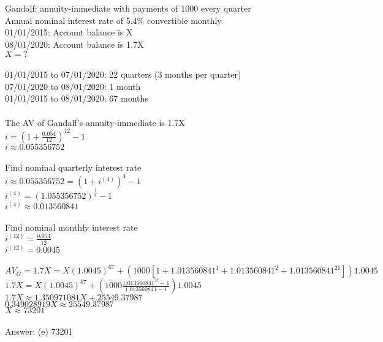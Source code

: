 \documentclass[12pt]{article}
\begin{document}
\section{}
Gandalf: annuity-immediate with payments of 1000 every quarter\\
Annual nominal interest rate of 5.4\% convertible monthly\\
01/01/2015: Account balance is X\\
08/01/2020: Account balance is 1.7X\\
$X=?$\\
\\
01/01/2015 to 07/01/2020: 22 quarters (3 months per quarter)\\
07/01/2020 to 08/01/2020: 1 month\\
01/01/2015 to 08/01/2020: 67 months\\
\\
The AV of Gandalf's annuity-immediate is 1.7X\\
$i=(1+\frac{0.054}{12})^{12}-1$\\
$i\approx0.055356752$\\
\\
Find nominal quarterly interest rate\\
$i\approx0.055356752=(1+i^{(4)})^{4}-1$\\
$i^{(4)}=(1.055356752)^{\frac{1}{4}}-1$\\
$i^{(4)}\approx0.013560841$\\
\\
Find nominal monthly interest rate\\
$i^{(12)}=\frac{0.054}{12}$\\
$i^{(12)}=0.0045$\\
\\
$AV_G=1.7X=X(1.0045)^{67}+(1000[1+1.013560841^1+1.013560841^2+1.013560841^{21}])1.0045$\\
$1.7X=X(1.0045)^{67}+(1000\frac{1.013560841^{22}-1}{1.013560841-1})1.0045$\\
$1.7X\approx1.350971081X+25549.37987$\\
$0.349028919X\approx25549.37987$\\
$X\approx73201$\\
\\
Answer: (e) 73201
\end{document}
